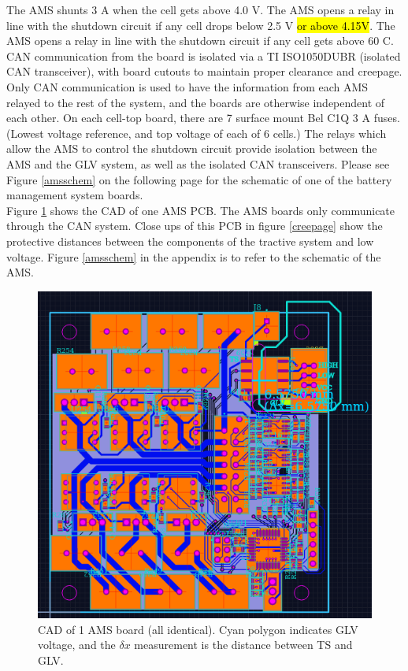 \documentclass{article}
\DeclareRobustCommand{\hlr}[1]{{\sethlcolor{red}\hl{#1}}}
\begin{document}
            The AMS shunts 3 A when the cell gets above 4.0 V. The AMS opens a relay in line with the shutdown circuit if any cell drops below 2.5 V \hlr{or above 4.15V}. The AMS opens a relay in line with the shutdown circuit if any cell gets above 60 \degree C.\\
            
            CAN communication from the board is isolated via a TI ISO1050DUBR (isolated CAN transceiver), with board cutouts to maintain proper clearance and creepage. Only CAN communication is used to have the information from each AMS relayed to the rest of the system, and the boards are otherwise independent of each other. On each cell-top board, there are 7 surface mount Bel C1Q 3 A fuses. (Lowest voltage reference, and top voltage of each of 6 cells.) The relays which allow the AMS to control the shutdown circuit provide isolation between the AMS and the GLV system, as well as the isolated CAN transceivers. Please see Figure \ref{amsschem} on the following page for the schematic of one of the battery management system boards.\\
            
            
            Figure \ref{bmspcb} shows the CAD of one AMS PCB. The AMS boards only communicate through the CAN system. Close ups of this PCB in figure \ref{creepage} show the protective distances between the components of the tractive system and low voltage. Figure \ref{amsschem} in the appendix is to refer to the schematic of the AMS. 
            
            \begin{figure}[H]
                \centering
                \includegraphics[width = 0.7 \textwidth]{bms_final1_PCBCAD}
                \caption{CAD of 1 AMS board (all identical). Cyan polygon indicates GLV voltage, and the $\delta x$ measurement is the distance between TS and GLV.}
                \label{bmspcb}
            \end{figure}
            
\end{document}
